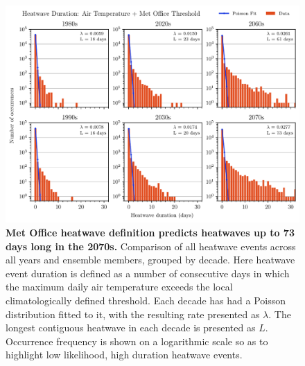 \documentclass[10pt,letterpaper]{article}
\begin{document}
\begin{figure}
\begin{adjustwidth}{-2.25in}{0in}
    \begin{center}
        \includegraphics[width=\linewidth]{./tas_poisson.pdf}
    \end{center}
    \caption{
    {\bf Met Office heatwave definition predicts heatwaves up to 73 days long in the 2070s.}
    Comparison of all heatwave events across all years and ensemble members, grouped by decade.
    Here heatwave event duration is defined as a number of consecutive days in which the maximum daily air temperature exceeds the local climatologically defined threshold.
    Each decade has had a Poisson distribution fitted to it, with the resulting rate presented as $\lambda$.
    The longest contiguous heatwave in each decade is presented as $L$.
    Occurrence frequency is shown on a logarithmic scale so as to highlight low likelihood, high duration heatwave events.
    }
    \label{tas-poisson}
\end{adjustwidth}
\end{figure}

\end{document}
